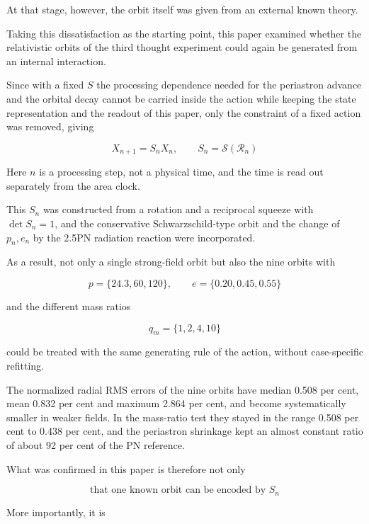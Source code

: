 \documentclass[
  a4paper,
]{article}
\begin{document}
At that stage, however, the orbit itself was given from an external
known theory.

Taking this dissatisfaction as the starting point, this paper examined
whether the relativistic orbits of the third thought experiment could
again be generated from an internal interaction.

Since with a fixed \(S\) the processing dependence needed for the
periastron advance and the orbital decay cannot be carried inside the
action while keeping the state representation and the readout of this
paper, only the constraint of a fixed action was removed, giving

\[
\boxed{
X_{n+1}=S_nX_n,
\qquad
S_n=\mathcal S(\mathcal R_n)
}
\]

Here \(n\) is a processing step, not a physical time, and the time is
read out separately from the area clock.

This \(S_n\) was constructed from a rotation and a reciprocal squeeze
with \(\det S_n=1\), and the conservative Schwarzschild-type orbit and
the change of \(p_n,e_n\) by the 2.5PN radiation reaction were
incorporated.

As a result, not only a single strong-field orbit but also the nine
orbits with

\[
p=\{24.3,60,120\},
\qquad
e=\{0.20,0.45,0.55\}
\]

and the different mass ratios

\[
q_m=\{1,2,4,10\}
\]

could be treated with the same generating rule of the action, without
case-specific refitting.

The normalized radial RMS errors of the nine orbits have median 0.508
per cent, mean 0.832 per cent and maximum 2.864 per cent, and become
systematically smaller in weaker fields. In the mass-ratio test they
stayed in the range 0.508 per cent to 0.438 per cent, and the periastron
shrinkage kept an almost constant ratio of about 92 per cent of the PN
reference.

What was confirmed in this paper is therefore not only

\[
\boxed{
\text{that one known orbit can be encoded by }S_n
}
\]

More importantly, it is

\begin{center}
\end{center}
\end{document}
